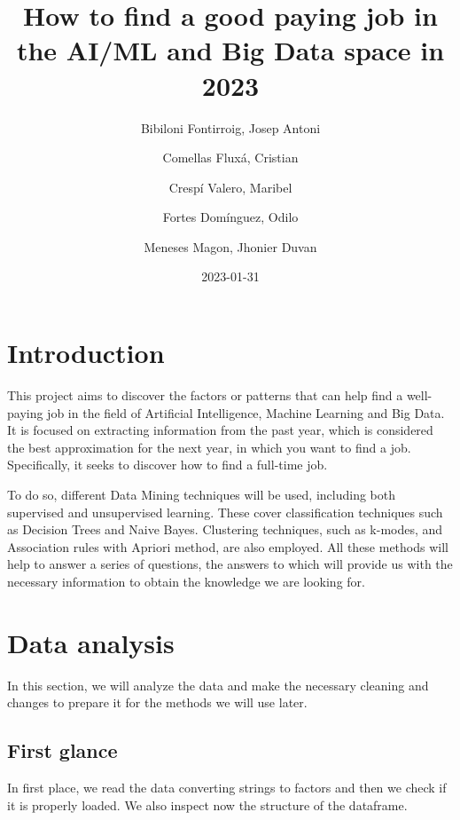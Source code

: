 \documentclass[
]{article}
\title{How to find a good paying job in the AI/ML and Big Data space in
2023}
\subtitle{Data Mining Final Project\\
\strut \\
GROUP 3 (ADA LOVELACE)}
\author{Bibiloni Fontirroig, Josep Antoni \and Comellas Fluxá,
Cristian \and Crespí Valero, Maribel \and Fortes Domínguez,
Odilo \and Meneses Magon, Jhonier Duvan}
\date{2023-01-31}
\begin{document}
\maketitle

{
\hypersetup{linkcolor=}
\setcounter{tocdepth}{3}
\tableofcontents
}
\newpage

\hypertarget{introduction}{%
\section{Introduction}\label{introduction}}

This project aims to discover the factors or patterns that can help find
a well-paying job in the field of Artificial Intelligence, Machine
Learning and Big Data. It is focused on extracting information from the
past year, which is considered the best approximation for the next year,
in which you want to find a job. Specifically, it seeks to discover how
to find a full-time job.

To do so, different Data Mining techniques will be used, including both
supervised and unsupervised learning. These cover classification
techniques such as Decision Trees and Naive Bayes. Clustering
techniques, such as k-modes, and Association rules with Apriori method,
are also employed. All these methods will help to answer a series of
questions, the answers to which will provide us with the necessary
information to obtain the knowledge we are looking for.

\hypertarget{data-analysis}{%
\section{Data analysis}\label{data-analysis}}

In this section, we will analyze the data and make the necessary
cleaning and changes to prepare it for the methods we will use later.

\hypertarget{first-glance}{%
\subsection{First glance}\label{first-glance}}

In first place, we read the data converting strings to factors and then
we check if it is properly loaded. We also inspect now the structure of
the dataframe.

\scriptsize
\end{document}
